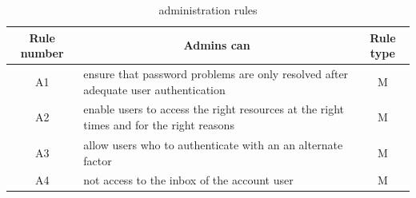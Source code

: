 \begin{table}[!htbp]         %
	\begin{center}
\begin{tabular}{|c|p{4.2cm}|c|}
\hline 
 \textbf{ Rule number} & \multicolumn{1}{|c|}{\textbf{Admins can}}  & \textbf{Rule type} \\ 
\hline 
 A1 & ensure that password problems are only resolved  after adequate user authentication & M \\ 
 \hline 
 A2 & enable users to access the right resources at  the right times and for the right reasons & M \\ 
 \hline 
 A3 & allow users who to authenticate with an  an alternate factor & M \\
 \hline 
 A4 &  not access to the inbox of the account user  & M  \\
\hline 
	\end{tabular}
	\end{center}
	\caption{ administration rules }
\vspace{-5mm}
\label{adminrules}
\end{table} 





